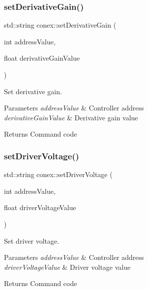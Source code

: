 \subsubsection{\texorpdfstring{set\+Derivative\+Gain()}{setDerivativeGain()}}
{\footnotesize\ttfamily std\+::string conex\+::set\+Derivative\+Gain (\begin{DoxyParamCaption}\item[{int}]{address\+Value,  }\item[{float}]{derivative\+Gain\+Value }\end{DoxyParamCaption})}



Set derivative gain. 


\begin{DoxyParams}{Parameters}
{\em address\+Value} & Controller address \\
\hline
{\em derivative\+Gain\+Value} & Derivative gain value \\
\hline
\end{DoxyParams}
\begin{DoxyReturn}{Returns}
Command code 
\end{DoxyReturn}
\mbox{\label{namespaceconex_a07def2519839ea99940a654201ff40b9}} 
\subsubsection{\texorpdfstring{set\+Driver\+Voltage()}{setDriverVoltage()}}
{\footnotesize\ttfamily std\+::string conex\+::set\+Driver\+Voltage (\begin{DoxyParamCaption}\item[{int}]{address\+Value,  }\item[{float}]{driver\+Voltage\+Value }\end{DoxyParamCaption})}



Set driver voltage. 


\begin{DoxyParams}{Parameters}
{\em address\+Value} & Controller address \\
\hline
{\em driver\+Voltage\+Value} & Driver voltage value \\
\hline
\end{DoxyParams}
\begin{DoxyReturn}{Returns}
Command code 
\end{DoxyReturn}
\mbox{\label{namespaceconex_a51a2f94e8cb024ecdc120c713dd19c7c}} 
